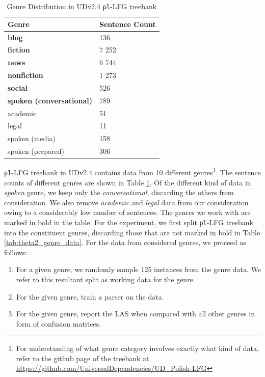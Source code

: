 \begin{table}[h]
    \centering
    \begin{tabular}{|l|l|}
        \hline
        \textbf{Genre} & \textbf{Sentence Count} \\
        \hline
        \hline
        \textbf{blog} & 136 \\
        \textbf{fiction} & 7 252 \\
        \textbf{news} & 6 744 \\
        \textbf{nonfiction} & 1 273 \\
        \textbf{social} & 526 \\
        \textbf{spoken (conversational)} & 789 \\
        academic & 51 \\
        legal & 11 \\
        spoken (media) & 158 \\
        spoken (prepared) & 306 \\
        \hline
    \end{tabular}
    \caption{Genre Distribution in UDv2.4 \texttt{pl}-LFG treebank}
    \label{tab:theta2_genre_dataw}
\end{table}

\verb|pl|-LFG treebank in UDv2.4 contains data from 10 different genres\footnote{For understanding of what genre category involves exactly what kind of data, refer to the github page of the treebank at \url{https://github.com/UniversalDependencies/UD_Polish-LFG}}. The sentence counts of different genres are shown in Table \ref{tab:theta2_genre_dataw}. Of the different kind of data in \textit{spoken} genre, we keep only the \textit{conversational}, discarding the others from consideration. We also remove \textit{academic} and \textit{legal} data from our consideration owing to a considerably low number of sentences. The genres we work with are marked in bold in the table. For the experiment, we first split \verb|pl|-LFG treebank into the constituent genres, discarding those that are not marked in bold in Table \ref{tab:theta2_genre_data}. For the data from considered genres, we proceed as follows:

\begin{enumerate}
    \item For a given genre, we randomly sample 125 instances from the genre data. We refer to this resultant split as working data for the genre.
    \item For the given genre, train a parser on the data.
    \item For the given genre, report the LAS when compared with all other genres in form of confusion matrices.
\end{enumerate}

